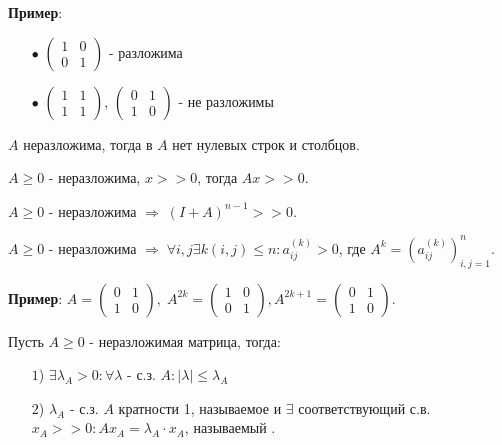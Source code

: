 \textbf{Пример}:
\begin{itemize}
	\item[$\bullet$]
		$\begin{pmatrix}
		1 & 0 \\
		0 & 1
	\end{pmatrix}$ - разложима
	\item[$\bullet$]
		$\begin{pmatrix}
		1 & 1 \\
		1 & 1
	\end{pmatrix}$, $\begin{pmatrix}
		0 & 1 \\
		1 & 0
	\end{pmatrix}$ - не разложимы
\end{itemize}

\begin{clair}[]\label{cha:7/clair:1}
	$A$ неразложима, тогда в $A$ нет нулевых строк и столбцов.
\end{clair}

\begin{clair}[]\label{cha:7/clair:2}
	$A \ge 0 $ - неразложима, $x >> 0$, тогда $A x >> 0$.
\end{clair}

\begin{clair}[]\label{cha:7/clair:3}
	$A \ge 0$ - неразложима $\Rightarrow \; (I+A)^{n-1} >> 0$.
\end{clair}

\begin{conseq}[]\label{cha:7/conseq:1}
	$A \ge 0$ - неразложима $\Rightarrow \; \forall i, j \exists k (i, j) \le n: a_{ij}^{(k)} > 0$, где $A^k = (a_{ij}^{(k)})_{i, j = 1}^{n}$. 
\end{conseq}

\textbf{Пример}: $A = \begin{pmatrix}
	0 & 1 \\ 1 & 0
\end{pmatrix}, \; A^{2k} = \begin{pmatrix}
	1 & 0 \\ 0 & 1
\end{pmatrix}, A^{2k+1} = \begin{pmatrix}
	0 & 1 \\ 1 & 0
\end{pmatrix}$.

\begin{theorem}\label{cha:7/the:1}
	Пусть $A \ge 0$ - неразложимая матрица, тогда:
	\begin{itemize}
		\item[$1$)]
			$\exists \lambda_A > 0: \forall \lambda$ - с.з. $A: |\lambda| \le \lambda_A$
		\item[$2$)]
			$\lambda_A$ - с.з. $A$ кратности 1, называемое  и $\exists$ соответствующий с.в. $x_A >> 0: A x_A = \lambda_A \cdot x_A$, называемый .
	\end{itemize}
\end{theorem}

